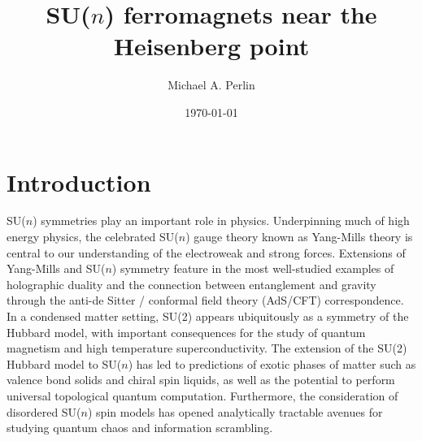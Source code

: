\documentclass[nofootinbib,notitlepage,11pt]{revtex4-2}
\newcommand{\1}{\mathds{1}}
\begin{document}
\title{SU($n$) ferromagnets near the Heisenberg point}
\author{Michael A. Perlin}
\date{\today}

\maketitle

\tableofcontents

\section{Introduction}

SU($n$) symmetries play an important role in physics.  Underpinning
much of high energy physics, the celebrated SU($n$) gauge theory known
as Yang-Mills theory is central to our understanding of the
electroweak and strong forces.  Extensions of Yang-Mills and SU($n$)
symmetry feature in the most well-studied examples of holographic
duality\cite{maldacena1999largen} and the connection between
entanglement and gravity\cite{ryu2006holographic} through the anti-de
Sitter / conformal field theory (AdS/CFT) correspondence.  In a
condensed matter setting, SU(2) appears ubiquitously as a symmetry of
the Hubbard model, with important consequences for the study of
quantum magnetism and high temperature
superconductivity\cite{lee2006doping}.  The extension of the SU(2)
Hubbard model to SU($n$) has led to predictions of exotic phases of
matter such as valence bond solids\cite{read1989valencebond,
  rokhsar1990quadratic, kaul2012lattice, hermele2011topological} and
chiral spin liquids\cite{hermele2009mott, hermele2011topological,
  chen2016syntheticgaugefield, nataf2016chiral}, as well as the
potential to perform universal topological quantum
computation\cite{freedman2004class, nayak2008nonabelian}.
Furthermore, the consideration of disordered SU($n$) spin models has
opened analytically tractable avenues for studying quantum chaos and
information scrambling\cite{sachdev1993gapless,
  bentsen2019integrable}.
\end{document}
